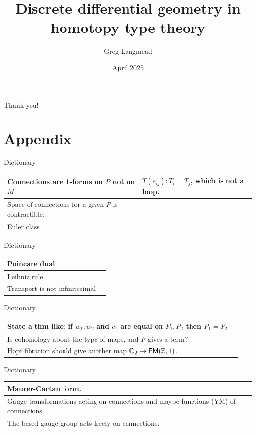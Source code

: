 \documentclass[13pt,aspectratio=169,hyperref={hypertexnames = false}]{beamer}
\title[Geometry in HoTT]{Discrete differential geometry in homotopy type theory}
\author{Greg Langmead}
\institute[CMU]{Carnegie Mellon University}
\date{April 2025}
\begin{document}
\begin{frame}
\titlepage
\end{frame}

\newlength{\mylen}
\newlength{\mylin}









\begin{frame}
\begin{center}
\alert{\huge{Thank you!}}
\end{center}
\end{frame}

\section{Appendix}
\begin{frame}{Dictionary}
\begin{tabular}{|p{18em}|p{18em}|}
\hline
Connections are 1-forms on \( P \) not on \( M \) & \( T(e_{ij}):T_i=T_j \), which is not a loop. \\ \hline
Space of connections for a given \( P \) is contractible. & \\ \hline
Euler class & \\ \hline
\end{tabular}
\end{frame}

\begin{frame}{Dictionary}
\begin{tabular}{|p{18em}|p{18em}|}
\hline
Poincare dual & \\ \hline
Leibniz rule & \\ \hline
Transport is not infinitesimal & \\ \hline
\end{tabular}
\end{frame}

\begin{frame}{Dictionary}
\begin{tabular}{|p{18em}|p{18em}|}
\hline
State a thm like: if \( w_1, w_2 \) and \( c_1 \) are equal on \( P_1, P_2 \) then \( P_1=P_2 \) & \\ \hline
Is cohomology about the type of maps, and \( F \) gives a term? & \\ \hline
Hopf fibration should give another map \( \mathbb{O}_2\to\mathsf{EM}(\mathbb{Z},1) \). & \\ \hline
\end{tabular}
\end{frame}

\begin{frame}{Dictionary}
\begin{tabular}{|p{18em}|p{18em}|}
\hline
Maurer-Cartan form. & \\ \hline
Gauge transformations acting on connections and maybe functions (YM) of connections. & \\ \hline
The based gauge group acts freely on connections. & \\ \hline
\end{tabular}
\end{frame}
\end{document}
